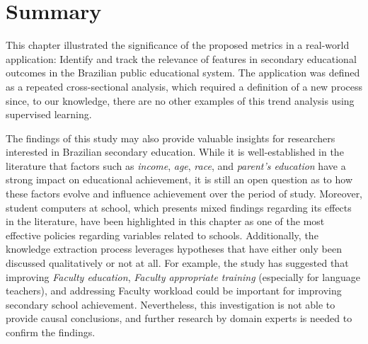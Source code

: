 \section{Summary}

This chapter illustrated the significance of the proposed metrics in a real-world application: Identify and track the relevance of features in secondary educational outcomes in the Brazilian public educational system. The application was defined as a repeated cross-sectional analysis, which required a definition of a new process since, to our knowledge,  there are no other examples of this trend analysis using supervised learning. 

The findings of this study may also provide valuable insights for researchers interested in Brazilian secondary education. While it is well-established in the literature that factors such as \textit{income}, \textit{age}, \textit{race}, and \textit{parent's education} have a strong impact on educational achievement, it is still an open question as to how these factors evolve and influence achievement over the period of study. Moreover, student computers at school, which presents mixed findings regarding its effects in the literature, have been highlighted in this chapter as one of the most effective policies regarding variables related to schools. Additionally, the knowledge extraction process leverages hypotheses that have either only been discussed qualitatively or not at all. For example, the study has suggested that improving \textit{Faculty education}, \textit{Faculty appropriate training} (especially for language teachers), and addressing Faculty workload could be important for improving secondary school achievement. Nevertheless, this investigation is not able to provide causal conclusions, and further research by domain experts is needed to confirm the findings. 